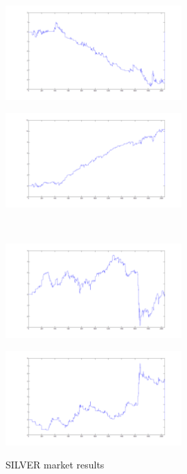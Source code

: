 \documentclass{tewiart}
\begin{document}
\begin{figure}[h]
\centering
\begin{minipage}{\linewidth}
\centering
\includegraphics[width=0.6\textwidth]{images/silverA.png}
\label{jedno}
\end{minipage}
\begin{minipage}{\linewidth}
\centering
\includegraphics[width=0.6\textwidth]{images/silverB.png}
\label{dwu}
\end{minipage}
\\
\begin{minipage}{\linewidth}
\centering
\includegraphics[width=0.6\textwidth]{images/silverC.png}
\label{cztero}
\end{minipage}
\begin{minipage}{\linewidth}
\centering
\includegraphics[width=0.6\textwidth]{images/silverD.png}
\label{mansard}
\end{minipage}
\caption{SILVER market results}
\end{figure}
\end{document}
